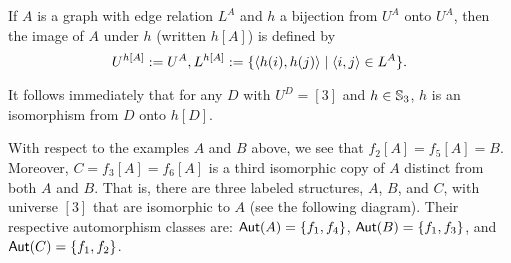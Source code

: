 \begin{definition}
If $A$ is a graph with edge relation $L^A$ and $h$ a bijection from $U^A$ onto $U^A$, then the image of $A$ under $h$ (written $h[A]$) is defined by
\[
    U^{h[A]} := U^A, L^{h[A]}:=\{\mbox{$\langle h(i),h(j) \rangle$}\mid\mbox{$\langle i,j \rangle$}\in L^A\}.
\]
\end{definition}

It follows immediately that for any $D$ with $U^D = [3]$ and $h \in \mbox{$\mathbb{S}_{3}$}$, $h$ is an isomorphism from $D$ onto $h[D]$. 

With respect to the examples $A$ and $B$ above, we see that $f_2[A]=f_5[A]=B$. Moreover, $C=f_3[A]=f_6[A]$ is a third isomorphic copy of $A$ distinct from both $A$ and $B$. That is, there are three labeled structures, $A$, $B$, and $C$, with universe $[3]$ that are isomorphic to $A$ (see the following diagram). Their respective automorphism classes are: $\mbox{$\mathsf{Aut}(A)$}=\{f_1, f_4\}$, $\mbox{$\mathsf{Aut}(B)$}=\{f_1, f_3\}$, and $\mbox{$\mathsf{Aut}(C)$}=\{f_1, f_2\}$.

